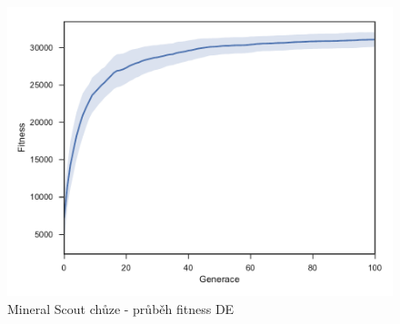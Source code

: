 \begin{figure}[t]\centering
	\includegraphics[width=\columnwidth]{../img/MineralMap/MineralScoutWalk}
	\caption{Mineral Scout chůze -  průběh fitness DE}
	\label{obr04:MineralScoutWalk}
\end{figure}
\clearpage

